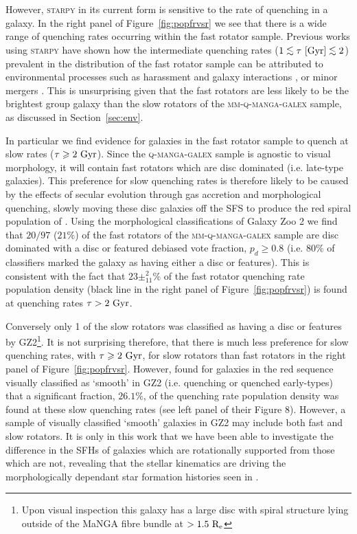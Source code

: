 \documentclass[useAMS,usenatbib]{mn2e}
\def\lesssim{\mathrel{\hbox{\rlap{\hbox{\lower3pt\hbox{$\sim$}}}\hbox{\raise2pt\hbox{$<$}}}}}
\begin{document}
However, \textsc{starpy} in its current form is sensitive to the rate of quenching in a galaxy. In the right panel of Figure~\ref{fig:popfrvsr} we see that there is a wide range of quenching rates occurring within the fast rotator sample. Previous works using \textsc{starpy} have shown how the intermediate quenching rates ($1 \lesssim \tau~[\rm{Gyr}]\lesssim 2$) prevalent in the distribution of the fast rotator sample can be attributed to environmental processes such as harassment and galaxy interactions \citep{smethurst17}, or minor mergers \citep{smethurst15}. This is unsurprising given that the fast rotators are less likely to be the brightest group galaxy than the slow rotators of the \textsc{mm-q-manga-galex} sample, as discussed in Section~\ref{sec:env}.

In particular we find evidence for galaxies in the fast rotator sample to quench at slow rates ($\tau \geq 2~\rm{Gyr}$). Since the \textsc{q-manga-galex} sample is agnostic to visual morphology, it will contain fast rotators which are disc dominated (i.e. late-type galaxies). This preference for slow quenching rates is therefore likely to be caused by the effects of secular evolution through gas accretion and morphological quenching, slowly moving these disc galaxies off the SFS to produce the red spiral population of \cite{masters12a}. Using the morphological classifications of Galaxy Zoo 2 \citep[GZ2][]{lintott11, GZ2} we find that $20/97$ ($21\%$) of the fast rotators of the \textsc{mm-q-manga-galex} sample are disc dominated with a disc or featured debiased vote fraction, $p_d \geq 0.8$ (i.e. $80\%$ of classifiers marked the galaxy as having either a disc or features). This is consistent with the fact that $23\pm^{2}_{11}\%$ of the fast rotator quenching rate population density (black line in the right panel of Figure~\ref{fig:popfrvsr}) is found at quenching rates $\tau > 2~\rm{Gyr}$. 

Conversely only 1 of the slow rotators was classified as having a disc or features by GZ2\footnote{Upon visual inspection this galaxy has a large disc with spiral structure lying outside of the MaNGA fibre bundle at $>1.5~\rm{R_e}$}. It is not surprising therefore, that there is much less preference for slow quenching rates, with $\tau \geq 2~\rm{Gyr}$, for slow rotators than fast rotators in the right panel of Figure~\ref{fig:popfrvsr}. However, \cite{smethurst15} found for galaxies in the red sequence visually classified as `smooth' in GZ2 (i.e. quenching or quenched early-types) that a significant fraction, $26.1\%$, of the quenching rate population density was found at these slow quenching rates (see left panel of their Figure 8). However, a sample of  visually classified `smooth' galaxies in GZ2 may include both fast and slow rotators. It is only in this work that we have been able to investigate the difference in the SFHs of galaxies which are rotationally supported from those which are not, revealing that the stellar kinematics are driving the morphologically dependant star formation histories seen in \cite{smethurst15}.
\end{document}

